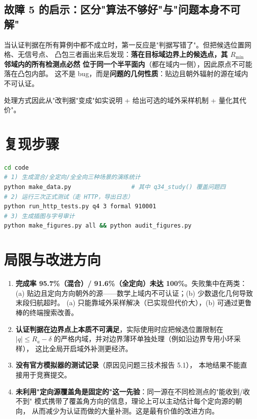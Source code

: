 \subsection{故障 5 的启示：区分"算法不够好"与"问题本身不可解"}

当认证判据在所有算例中都不成立时，第一反应是"判据写错了"。但把候选位置网格、无信号点、
凸包三者画出来后发现：\textbf{落在目标域边界上的候选点，其 $R_{\min}$ 邻域内的所有检测点必然
位于同一个半平面内}（都在域内一侧），因此原点不可能落在凸包内部。
这不是 bug，而是\textbf{问题的几何性质}：贴边且朝外辐射的源在域内不可认证。

处理方式因此从"改判据"变成"如实说明 + 给出可选的域外采样机制 + 量化其代价"。

\section{复现步骤}

\begin{lstlisting}[language=bash,caption={复现问题四全部结果}]
cd code
# 1) 生成混合/全定向/全全向三种场景的演练统计
python make_data.py                 # 其中 q34_study() 覆盖问题四
# 2) 运行三次正式测试（走 HTTP，导出日志）
python run_http_tests.py q4 3 formal 910001
# 3) 生成插图与字号审计
python make_figures.py all && python audit_figures.py
\end{lstlisting}

\section{局限与改进方向}

\begin{enumerate}[leftmargin=1.8em]
  \item \textbf{完成率 95.7\%（混合）/ 91.6\%（全定向）未达 100\%}。失败集中在两类：
        (a) 贴边且定向方向朝外的源——数学上域内不可认证；(b) 少数退化几何导致末段归航超时。
        (a) 只能靠域外采样解决（已实现但代价大），(b) 可通过更鲁棒的终端搜索改善。
  \item \textbf{认证判据在边界点上本质不可满足}，实际使用时应把候选位置限制在
        $|q|\le R_a-\delta$ 的严格内域，并对边界薄环单独处理（例如沿边界专用小环采样），
        这比全局开启域外补测更经济。
  \item \textbf{没有官方模拟器的测试记录}（原因见问题三技术报告 5.1），
        本地结果不能直接用于竞赛提交。
  \item \textbf{未利用"定向源覆盖角是固定的"这一先验}：同一源在不同检测点的"能收到/收不到"
        模式携带了覆盖角方向的信息，理论上可以主动估计每个定向源的朝向，
        从而减少为认证而做的大量补测。这是最有价值的改进方向。
\end{enumerate}


